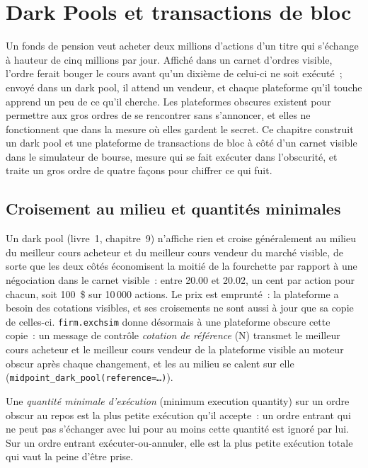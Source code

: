 \chapter{Dark Pools et transactions de bloc}\label{ch:mx:dark-pools-and-blocks}

Un fonds de pension veut acheter deux millions d'actions d'un titre qui s'échange à hauteur de cinq millions par jour. Affiché dans un carnet d'ordres visible, l'ordre ferait bouger le cours avant
qu'un dixième de celui-ci ne soit exécuté~; envoyé dans un dark pool, il attend un vendeur, et chaque plateforme qu'il touche apprend un peu de ce qu'il cherche. Les plateformes obscures existent pour permettre
aux gros ordres de se rencontrer sans s'annoncer, et elles ne fonctionnent que dans la mesure où elles gardent le secret. Ce chapitre construit un dark pool et une
plateforme de transactions de bloc à côté d'un carnet visible dans le simulateur de bourse, mesure qui se fait exécuter dans l'obscurité, et traite un gros ordre de quatre façons pour chiffrer ce qui fuit.

\section{Croisement au milieu et quantités minimales}

Un dark pool (livre~1, chapitre~9) n'affiche rien et croise généralement au milieu du meilleur cours acheteur et du meilleur cours vendeur du marché visible, de sorte que les deux côtés
économisent la moitié de la fourchette par rapport à une négociation dans le carnet visible~: entre 20.00 et 20.02, un cent par action pour chacun, soit 100~\$ sur 10\,000 actions. Le prix est emprunté~:
la plateforme a besoin des cotations visibles, et ses croisements ne sont aussi à jour que sa copie de celles-ci. \texttt{firm.exchsim} donne désormais à une plateforme obscure cette copie~: un
message de contrôle \emph{cotation de référence} (N) transmet le meilleur cours acheteur et le meilleur cours vendeur de la plateforme visible au moteur obscur après chaque changement, et les  au milieu
se calent sur elle (\texttt{midpoint\_dark\_pool(reference=\dots)}).

\begin{definition}\label{def:mx:dark-pools-and-blocks:minqty}
Une \emph{quantité minimale d'exécution} (minimum execution quantity) sur un ordre obscur au repos est la plus petite exécution qu'il accepte~: un ordre entrant qui
ne peut pas s'échanger avec lui pour au moins cette quantité est ignoré par lui. Sur un ordre entrant exécuter-ou-annuler, elle est la plus petite exécution totale qui vaut la peine d'être prise.
\end{definition}

